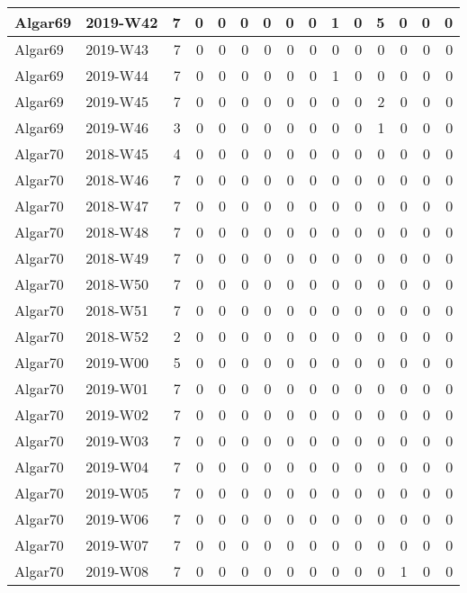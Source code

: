 \documentclass[]{book}
\begin{document}
\begin{table}
\begin{tabular}[t]{l|l|r|r|r|r|r|r|r|r|r|r|r|r|r}
\hline
Algar69 & 2019-W42 & 7 & 0 & 0 & 0 & 0 & 0 & 0 & 1 & 0 & 5 & 0 & 0 & 0\\
\hline
Algar69 & 2019-W43 & 7 & 0 & 0 & 0 & 0 & 0 & 0 & 0 & 0 & 0 & 0 & 0 & 0\\
\hline
Algar69 & 2019-W44 & 7 & 0 & 0 & 0 & 0 & 0 & 0 & 1 & 0 & 0 & 0 & 0 & 0\\
\hline
Algar69 & 2019-W45 & 7 & 0 & 0 & 0 & 0 & 0 & 0 & 0 & 0 & 2 & 0 & 0 & 0\\
\hline
Algar69 & 2019-W46 & 3 & 0 & 0 & 0 & 0 & 0 & 0 & 0 & 0 & 1 & 0 & 0 & 0\\
\hline
Algar70 & 2018-W45 & 4 & 0 & 0 & 0 & 0 & 0 & 0 & 0 & 0 & 0 & 0 & 0 & 0\\
\hline
Algar70 & 2018-W46 & 7 & 0 & 0 & 0 & 0 & 0 & 0 & 0 & 0 & 0 & 0 & 0 & 0\\
\hline
Algar70 & 2018-W47 & 7 & 0 & 0 & 0 & 0 & 0 & 0 & 0 & 0 & 0 & 0 & 0 & 0\\
\hline
Algar70 & 2018-W48 & 7 & 0 & 0 & 0 & 0 & 0 & 0 & 0 & 0 & 0 & 0 & 0 & 0\\
\hline
Algar70 & 2018-W49 & 7 & 0 & 0 & 0 & 0 & 0 & 0 & 0 & 0 & 0 & 0 & 0 & 0\\
\hline
Algar70 & 2018-W50 & 7 & 0 & 0 & 0 & 0 & 0 & 0 & 0 & 0 & 0 & 0 & 0 & 0\\
\hline
Algar70 & 2018-W51 & 7 & 0 & 0 & 0 & 0 & 0 & 0 & 0 & 0 & 0 & 0 & 0 & 0\\
\hline
Algar70 & 2018-W52 & 2 & 0 & 0 & 0 & 0 & 0 & 0 & 0 & 0 & 0 & 0 & 0 & 0\\
\hline
Algar70 & 2019-W00 & 5 & 0 & 0 & 0 & 0 & 0 & 0 & 0 & 0 & 0 & 0 & 0 & 0\\
\hline
Algar70 & 2019-W01 & 7 & 0 & 0 & 0 & 0 & 0 & 0 & 0 & 0 & 0 & 0 & 0 & 0\\
\hline
Algar70 & 2019-W02 & 7 & 0 & 0 & 0 & 0 & 0 & 0 & 0 & 0 & 0 & 0 & 0 & 0\\
\hline
Algar70 & 2019-W03 & 7 & 0 & 0 & 0 & 0 & 0 & 0 & 0 & 0 & 0 & 0 & 0 & 0\\
\hline
Algar70 & 2019-W04 & 7 & 0 & 0 & 0 & 0 & 0 & 0 & 0 & 0 & 0 & 0 & 0 & 0\\
\hline
Algar70 & 2019-W05 & 7 & 0 & 0 & 0 & 0 & 0 & 0 & 0 & 0 & 0 & 0 & 0 & 0\\
\hline
Algar70 & 2019-W06 & 7 & 0 & 0 & 0 & 0 & 0 & 0 & 0 & 0 & 0 & 0 & 0 & 0\\
\hline
Algar70 & 2019-W07 & 7 & 0 & 0 & 0 & 0 & 0 & 0 & 0 & 0 & 0 & 0 & 0 & 0\\
\hline
Algar70 & 2019-W08 & 7 & 0 & 0 & 0 & 0 & 0 & 0 & 0 & 0 & 0 & 1 & 0 & 0\\

\end{tabular}
\end{table}
\end{document}
